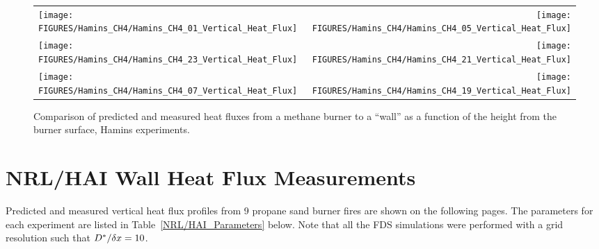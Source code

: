 \begin{figure}[p]
\begin{tabular*}{\textwidth}{l@{\extracolsep{\fill}}r}
\texttt{[image: FIGURES/Hamins\_CH4/Hamins\_CH4\_01\_Vertical\_Heat\_Flux]} &
\texttt{[image: FIGURES/Hamins\_CH4/Hamins\_CH4\_05\_Vertical\_Heat\_Flux]} \\
\texttt{[image: FIGURES/Hamins\_CH4/Hamins\_CH4\_23\_Vertical\_Heat\_Flux]} &
\texttt{[image: FIGURES/Hamins\_CH4/Hamins\_CH4\_21\_Vertical\_Heat\_Flux]} \\
\texttt{[image: FIGURES/Hamins\_CH4/Hamins\_CH4\_07\_Vertical\_Heat\_Flux]} &
\texttt{[image: FIGURES/Hamins\_CH4/Hamins\_CH4\_19\_Vertical\_Heat\_Flux]}
\end{tabular*}
\label{Hamins_CH4_Vertical}
\caption[Vertical heat flux predictions, Hamins methane burner experiments.]
{Comparison of predicted and measured heat fluxes from a methane burner to a ``wall'' as a function of the height from the burner surface, Hamins experiments.}
\end{figure}

\clearpage


\section{NRL/HAI Wall Heat Flux Measurements}

Predicted and measured vertical heat flux profiles from 9 propane sand burner fires are shown on the following pages.
The parameters for each
experiment are listed in Table~\ref{NRL/HAI_Parameters} below. Note that all the FDS simulations were performed with
a grid resolution such that
$D^*/\delta x=10$.

